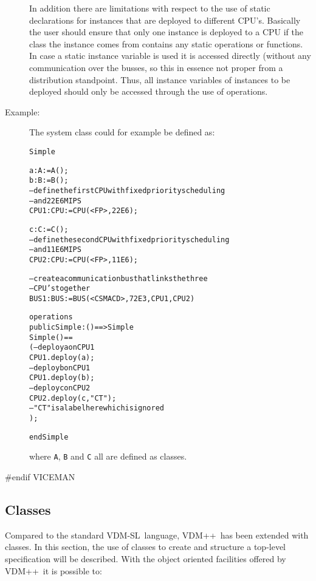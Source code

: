 \documentclass[\pformat,12pt]{article}
\newcommand{\vdmsl}{VDM-SL}
\newcommand{\vdmpp}{VDM++}
\begin{document}
\begin{description}
In addition there are limitations with respect to the use of static
declarations for instances that are deployed to different
CPU's. Basically the user should ensure that only one instance is
deployed to a CPU if the class the instance comes from contains any
static operations or functions. In case a static instance variable is
used it is accessed directly (without any communication over the
busses, so this in essence not proper from a distribution
standpoint. Thus, all instance variables of instances to be deployed
should only be accessed through the use of operations.

\item[Example:] The system class could for example be defined as:
\begin{alltt}
 Simple

 a : A :=  A();
   b : B :=  B();
  -- define the first CPU with fixed priority scheduling 
  -- and 22E6 MIPS
  CPU1 : CPU :=  CPU (<FP>, 22E6);

   c : C :=  C();
  -- define the second CPU with fixed priority scheduling 
  -- and 11E6 MIPS
  CPU2 : CPU :=  CPU (<FP>, 11E6);

  -- create a communication bus that links the three 
  -- CPU's together
  BUS1 : BUS :=  BUS (<CSMACD>, 72E3, {CPU1, CPU2})

operations
  public Simple: () ==> Simple
  Simple () ==
    ( -- deploy a on CPU1
      CPU1.deploy(a);
      -- deploy b on CPU1
      CPU1.deploy(b);
      -- deploy c on CPU2
      CPU2.deploy(c,"CT"); 
      -- "CT" is a label here which is ignored
    );

end Simple
\end{alltt} 
\noindent where \texttt{A}, \texttt{B} and \texttt{C} all are defined
as classes.
\end{description}
#endif VICEMAN

\subsection{Classes}
\label{sec:classdep}

Compared to the standard \vdmsl\ language,  \vdmpp\ has been
extended with classes. In this section, the use of classes to create
and structure a top-level specification will be described. With the
object oriented facilities offered by \vdmpp\ it is possible to:
\end{document}
